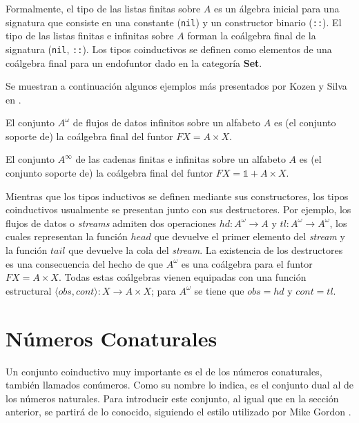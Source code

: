 Formalmente, el tipo de las listas finitas sobre $A$ es un álgebra inicial para una signatura que consiste en una constante (\texttt{nil}) y un constructor binario (\texttt{::}). El tipo de las listas finitas e infinitas sobre $A$ forman la coálgebra final de la signatura (\texttt{nil}, \texttt{::}). Los tipos coinductivos se definen como elementos de una coálgebra final para un endofuntor dado en la categoría \textbf{Set}. 

Se muestran a continuación algunos ejemplos más presentados por Kozen y Silva en \cite{kozen:2017}.

\begin{ejemplo}
El conjunto $A^{\omega}$ de flujos de datos infinitos sobre un alfabeto $A$ es (el conjunto soporte de) la coálgebra final del funtor $\mathit{F}X = A \times X$.
\end{ejemplo}

\begin{ejemplo}
El conjunto $A^{\infty}$ de las cadenas finitas e infinitas sobre un alfabeto $A$ es (el conjunto soporte de) la coálgebra final del funtor $\mathit{F}X = \mathds{1} + A \times X$.
\end{ejemplo}

Mientras que los tipos inductivos se definen mediante sus constructores, los tipos coinductivos usualmente se presentan junto con sus destructores. Por ejemplo, los flujos de datos o \textit{streams} admiten dos operaciones $hd: A^{\omega} \rightarrow A$ y $tl : A^{\omega} \rightarrow A^{\omega}$, los cuales representan la función $head$ que devuelve el primer elemento del \textit{stream} y la función $tail$ que devuelve la cola del \textit{stream}. La existencia de los destructores es una consecuencia del hecho de que $A^{\omega}$ es una coálgebra para el funtor $\mathit{F}X = A \times X$. Todas estas coálgebras vienen equipadas con una función estructural $\langle obs, cont \rangle  : X \rightarrow A \times X$; para $A^{\omega}$ se tiene que $obs = hd$ y $cont = tl$.

\section{Números Conaturales}\label{delay:conat}

Un conjunto coinductivo muy importante es el de los números conaturales, también llamados conúmeros. Como su nombre lo indica, es el conjunto dual al de los números naturales. Para introducir este conjunto, al igual que en la sección anterior, se partirá de lo conocido, siguiendo el estilo utilizado por Mike Gordon \cite{gordon:2017}.

